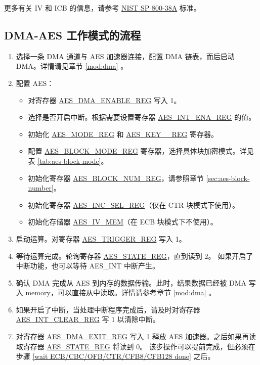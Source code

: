 \documentclass[main\_\_CN.tex]{subfiles}
\begin{document}
更多有关 IV 和 ICB 的信息，请参考 \href{https://nvlpubs.nist.gov/nistpubs/Legacy/SP/nistspecialpublication800-38a.pdf}{NIST SP 800-38A} 标准。

\subsection{DMA-AES 工作模式的流程 }

\begin{enumerate}
    \item 选择一条 DMA 通道与 AES 加速器连接，配置 DMA 链表，而后启动 DMA。详情请见章节 \ref{mod:dma} \textit{}。
    \item 配置 AES：
    \begin{itemize}
        \item 对寄存器 \hyperref[regdesc:AESDMAENABLEREG]{AES\_DMA\_ENABLE\_REG} 写入 1。
        \item 选择是否开启中断。根据需要设置寄存器 \hyperref[regdesc:AESINTENAREG]{AES\_INT\_ENA\_REG} 的值。
        \item 初始化 \hyperref[regdesc:AESMODEREG]{AES\_MODE\_REG} 和 \hyperref[regdesc:AESKEYnREG]{AES\_KEY\_\_REG} 寄存器。
        \item 配置 \hyperref[regdesc:AESBLOCKMODEREG]{AES\_BLOCK\_MODE\_REG} 寄存器，选择具体块加密模式。详见表 \ref{tab:aes-block-mode}。
        \item 初始化寄存器 \hyperref[regdesc:AESBLOCKNUMREG]{AES\_BLOCK\_NUM\_REG}，请参照章节 \ref{sec:aes-block-number}。
        \item 初始化寄存器 \hyperref[regdesc:AESINCSELREG]{AES\_INC\_SEL\_REG}（仅在 CTR 块模式下使用）。
        \item 初始化存储器 \hyperref[memdesc:AESIVMEM]{AES\_IV\_MEM}（在 ECB 块模式下不使用）。
    \end{itemize}
    \item 启动运算。对寄存器 \hyperref[regdesc:AESTRIGGERREG]{AES\_TRIGGER\_REG} 写入 1。
    \item \label{wait ECB/CBC/OFB/CTR/CFB8/CFB128 done}
            等待运算完成。轮询寄存器 \hyperref[regdesc:AESSTATEREG]{AES\_STATE\_REG}，直到读到 2。
            如果开启了中断功能，也可以等待 AES\_INT 中断产生。
    \item 确认 DMA 完成从 AES 到内存的数据传输。此时，结果数据已经被 DMA 写入 memory，可以直接从中读取。详情请参考章节 \ref{mod:dma} \textit{}。
    \item 如果开启了中断，当处理中断程序完成后，请及时对寄存器 \hyperref[regdesc:AESINTCLEARREG]{AES\_INT\_CLEAR\_REG} 写 1 以清除中断。
    \item 对寄存器 \hyperref[regdesc:AESDMAEXITREG]{AES\_DMA\_EXIT\_REG} 写入 1 释放 AES 加速器。之后如果再读取寄存器 \hyperref[regdesc:AESSTATEREG]{AES\_STATE\_REG} 将读到 0。
    该步操作可以提前完成，但必须在步骤 \ref{wait ECB/CBC/OFB/CTR/CFB8/CFB128 done} 之后。
\end{enumerate}
\end{document}
